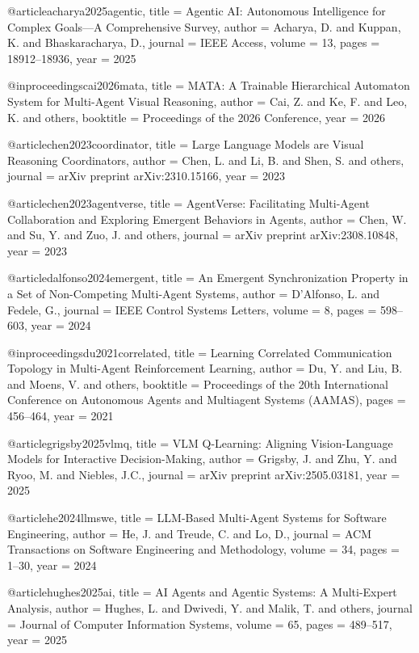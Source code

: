 @article{acharya2025agentic,
  title   = {Agentic {AI}: Autonomous Intelligence for Complex Goals---A Comprehensive Survey},
  author  = {Acharya, D. and Kuppan, K. and Bhaskaracharya, D.},
  journal = {IEEE Access},
  volume  = {13},
  pages   = {18912--18936},
  year    = {2025}
}

@inproceedings{cai2026mata,
  title   = {{MATA}: A Trainable Hierarchical Automaton System for Multi-Agent Visual Reasoning},
  author  = {Cai, Z. and Ke, F. and Leo, K. and others},
  booktitle = {Proceedings of the 2026 Conference},
  year    = {2026}
}

@article{chen2023coordinator,
  title   = {Large Language Models are Visual Reasoning Coordinators},
  author  = {Chen, L. and Li, B. and Shen, S. and others},
  journal = {arXiv preprint arXiv:2310.15166},
  year    = {2023}
}

@article{chen2023agentverse,
  title   = {{AgentVerse}: Facilitating Multi-Agent Collaboration and Exploring Emergent Behaviors in Agents},
  author  = {Chen, W. and Su, Y. and Zuo, J. and others},
  journal = {arXiv preprint arXiv:2308.10848},
  year    = {2023}
}

@article{dalfonso2024emergent,
  title   = {An Emergent Synchronization Property in a Set of Non-Competing Multi-Agent Systems},
  author  = {D'Alfonso, L. and Fedele, G.},
  journal = {IEEE Control Systems Letters},
  volume  = {8},
  pages   = {598--603},
  year    = {2024}
}

@inproceedings{du2021correlated,
  title   = {Learning Correlated Communication Topology in Multi-Agent Reinforcement Learning},
  author  = {Du, Y. and Liu, B. and Moens, V. and others},
  booktitle = {Proceedings of the 20th International Conference on Autonomous Agents and Multiagent Systems (AAMAS)},
  pages   = {456--464},
  year    = {2021}
}

@article{grigsby2025vlmq,
  title   = {{VLM Q-Learning}: Aligning Vision-Language Models for Interactive Decision-Making},
  author  = {Grigsby, J. and Zhu, Y. and Ryoo, M. and Niebles, J.C.},
  journal = {arXiv preprint arXiv:2505.03181},
  year    = {2025}
}

@article{he2024llmswe,
  title   = {{LLM}-Based Multi-Agent Systems for Software Engineering},
  author  = {He, J. and Treude, C. and Lo, D.},
  journal = {ACM Transactions on Software Engineering and Methodology},
  volume  = {34},
  pages   = {1--30},
  year    = {2024}
}

@article{hughes2025ai,
  title   = {{AI} Agents and Agentic Systems: A Multi-Expert Analysis},
  author  = {Hughes, L. and Dwivedi, Y. and Malik, T. and others},
  journal = {Journal of Computer Information Systems},
  volume  = {65},
  pages   = {489--517},
  year    = {2025}
}

